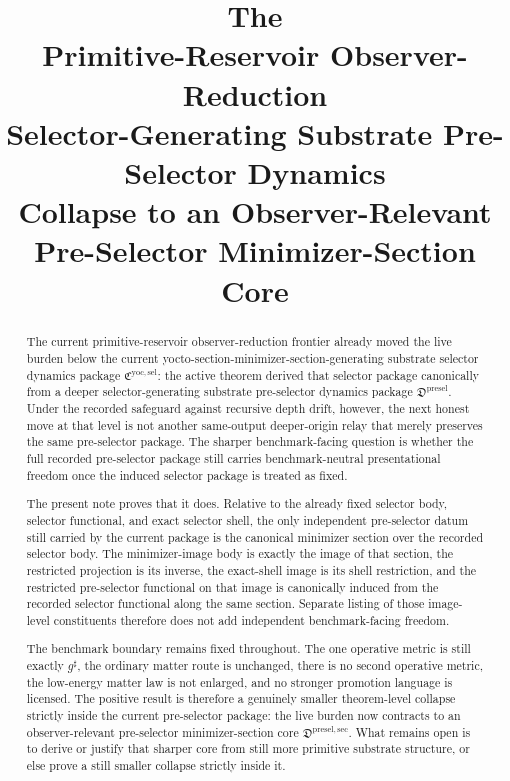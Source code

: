 \documentclass[11pt]{article}
\title{\textbf{The \TheoryName{}}\\[0.4em]
\large Primitive-Reservoir Observer-Reduction\\
\large Selector-Generating Substrate Pre-Selector Dynamics\\
\large Collapse to an Observer-Relevant Pre-Selector Minimizer-Section Core}
\author{}
\date{}
\newcommand{\CompletedMetric}{g^{\sharp}}
\newcommand{\YoctoSelectorPackage}{\mathfrak C^{\mathrm{yoc,sel}}}
\newcommand{\PreSelectorPackage}{\mathfrak D^{\mathrm{presel}}}
\newcommand{\PreSelectorMinSectionCore}{\mathfrak D^{\mathrm{presel,sec}}}
\begin{document}
\maketitle

\begin{abstract}
The current primitive-reservoir observer-reduction frontier already moved the live burden below the current yocto-section-minimizer-section-generating substrate selector dynamics package \(\YoctoSelectorPackage\): the active theorem derived that selector package canonically from a deeper selector-generating substrate pre-selector dynamics package \(\PreSelectorPackage\). Under the recorded safeguard against recursive depth drift, however, the next honest move at that level is not another same-output deeper-origin relay that merely preserves the same pre-selector package. The sharper benchmark-facing question is whether the full recorded pre-selector package still carries benchmark-neutral presentational freedom once the induced selector package is treated as fixed.

The present note proves that it does. Relative to the already fixed selector body, selector functional, and exact selector shell, the only independent pre-selector datum still carried by the current package is the canonical minimizer section over the recorded selector body. The minimizer-image body is exactly the image of that section, the restricted projection is its inverse, the exact-shell image is its shell restriction, and the restricted pre-selector functional on that image is canonically induced from the recorded selector functional along the same section. Separate listing of those image-level constituents therefore does not add independent benchmark-facing freedom.

The benchmark boundary remains fixed throughout. The one operative metric is still exactly \(\CompletedMetric\), the ordinary matter route is unchanged, there is no second operative metric, the low-energy matter law is not enlarged, and no stronger promotion language is licensed. The positive result is therefore a genuinely smaller theorem-level collapse strictly inside the current pre-selector package: the live burden now contracts to an observer-relevant pre-selector minimizer-section core \(\PreSelectorMinSectionCore\). What remains open is to derive or justify that sharper core from still more primitive substrate structure, or else prove a still smaller collapse strictly inside it.
\end{abstract}
\end{document}
